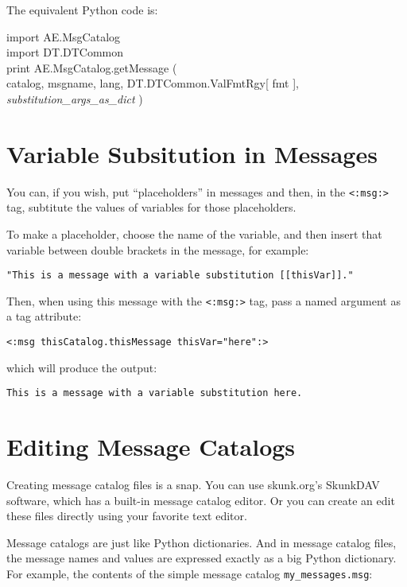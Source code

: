 \documentclass{manual}
\begin{document}
{{The equivalent Python code is:
\begin{obeylines}\ttfamily
import AE.MsgCatalog
import DT.DTCommon
print AE.MsgCatalog.getMessage ( 
    catalog, msgname, lang, DT.DTCommon.ValFmtRgy[ fmt ], 
    \emph{substitution_args_as_dict} )
\end{obeylines}

\section{Variable Subsitution in Messages}
\label{msgcatvarsub}

You can, if you wish, put ``placeholders'' in
messages and then, in the 
\texttt{<:msg:>} 
tag, subtitute the values of variables for those
placeholders.

To make a placeholder, choose the name of the variable, 
and then insert that variable between double brackets in
the message, for example:

\begin{verbatim}
"This is a message with a variable substitution [[thisVar]]."
\end{verbatim}

Then, when using this message with the
\texttt{<:msg:>} 
tag, pass a named argument as a tag attribute:

\begin{verbatim}
<:msg thisCatalog.thisMessage thisVar="here":>
\end{verbatim}

which will produce the output:

\begin{verbatim}
This is a message with a variable substitution here.
\end{verbatim}


\section{Editing Message Catalogs}
\label{msgcatedit}

Creating message catalog files is a snap. You can
use skunk.org's SkunkDAV software, which has a built-in
message catalog editor. Or you can create an edit
these files directly using your favorite text editor.

Message catalogs are just like Python dictionaries.
And in message catalog files, the message names and
values are expressed exactly as a big Python dictionary.
For example, the contents of the simple message catalog
\texttt{my_messages.msg}:

}}
\end{document}
